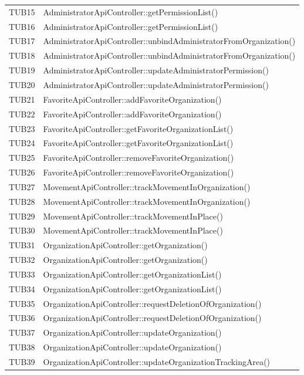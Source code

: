 {\begin{longtable}{C{2cm} C{12cm}}
		TUB15 & AdministratorApiController::getPermissionList()\\
		TUB16 & AdministratorApiController::getPermissionList()\\
		TUB17 & AdministratorApiController::unbindAdministratorFromOrganization()\\
		TUB18 & AdministratorApiController::unbindAdministratorFromOrganization()\\
		TUB19 & AdministratorApiController::updateAdministratorPermission()\\
		TUB20 & AdministratorApiController::updateAdministratorPermission()\\
		TUB21 & FavoriteApiController::addFavoriteOrganization()\\
		TUB22 & FavoriteApiController::addFavoriteOrganization()\\
		TUB23 & FavoriteApiController::getFavoriteOrganizationList()\\
		TUB24 & FavoriteApiController::getFavoriteOrganizationList()\\
		TUB25 & FavoriteApiController::removeFavoriteOrganization()\\
		TUB26 & FavoriteApiController::removeFavoriteOrganization()\\
		TUB27 & MovementApiController::trackMovementInOrganization()\\
		TUB28 & MovementApiController::trackMovementInOrganization()\\
		TUB29 & MovementApiController::trackMovementInPlace()\\
		TUB30 & MovementApiController::trackMovementInPlace()\\
		TUB31 & OrganizationApiController::getOrganization()\\
		TUB32 & OrganizationApiController::getOrganization()\\
		TUB33 & OrganizationApiController::getOrganizationList()\\
		TUB34 & OrganizationApiController::getOrganizationList()\\
		TUB35 & OrganizationApiController::requestDeletionOfOrganization()\\
		TUB36 & OrganizationApiController::requestDeletionOfOrganization()\\
		TUB37 & OrganizationApiController::updateOrganization()\\
		TUB38 & OrganizationApiController::updateOrganization()\\
		TUB39 & OrganizationApiController::updateOrganizationTrackingArea()\\

\end{longtable}}
